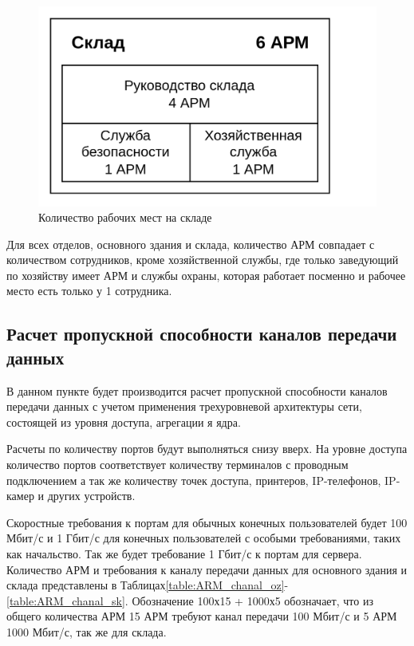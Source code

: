 \begin{figure}[H]
\centering
\includegraphics[scale=0.17]{../misc/org_structure_ARM_sk.png}
\caption{Количество рабочих мест на складе\label{fig:structure_ARM_sk}}
\end{figure}

Для всех отделов, основного здания и склада, количество АРМ совпадает с количеством сотрудников, кроме хозяйственной службы, где только заведующий по хозяйству имеет АРМ и службы охраны, которая работает посменно и рабочее место есть только у 1 сотрудника. 





\subsection{Расчет пропускной способности каналов передачи данных}
В данном пункте будет производится расчет пропускной способности каналов передачи данных  с учетом применения трехуровневой архитектуры сети, состоящей из уровня доступа, агрегации я ядра.

Расчеты по количеству портов будут выполняться снизу вверх. На уровне доступа количество портов соответствует количеству терминалов с проводным подключением а так же количеству точек доступа, принтеров, IP-телефонов, IP-камер и других устройств\cite{tcp-mech}.

Скоростные требования к портам для обычных конечных пользователей будет 100 Мбит/с и 1 Гбит/с для конечных пользователей с особыми требованиями, таких как начальство. Так же будет требование 1 Гбит/с к портам для сервера. Количество АРМ и требования к каналу передачи данных для основного здания и склада представлены в Таблицах\;\ref{table:ARM_chanal_oz}-\;\ref{table:ARM_chanal_sk}. Обозначение 100х15 + 1000х5 обозначает, что из общего количества АРМ 15 АРМ требуют канал передачи 100 Мбит/с и 5 АРМ 1000 Мбит/с, так же для склада.


